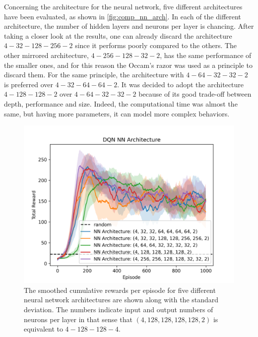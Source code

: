 \documentclass{article}
\begin{document}
Concerning the architecture for the neural network, 
five different architectures have been evaluated, as shown in \autoref{fig:comp_nn_arch}. 
In each of the different architecture, the number of hidden layers and neurons per layer is chancing. 
After taking a closer look at the results, one can already discard the architecture $4-32-128-256-2$ since it performs poorly compared to the others. 
The other mirrored architecture, $4-256-128-32-2$, has the same performance of the smaller ones, and for this reason the Occam's razor was used as a principle to discard them.
For the same principle, the architecture with $4-64-32-32-2$ is preferred over $4-32-64-64-2$. 
It was decided to adopt the architecture $4-128-128-2$ over $4-64-32-32-2$ because of its good trade-off between depth, performance and size. 
Indeed, the computational time was almost the same, but having more parameters, it can model more complex behaviors.

\begin{figure}[ht!]
   \centering
   \includegraphics[width=0.9\columnwidth]{assets/fig_hp/nn_architecture.png}
   \caption{The smoothed cumulative rewards per episode for five different neural network architectures are shown 
   along with the standard deviation. 
   The numbers indicate input and output numbers of neurons per layer in that sense that $(4,128,128,128,128,2)$ is equivalent to $4-128-128-4$.
   }
   \label{fig:comp_nn_arch}
\end{figure}
\end{document}
